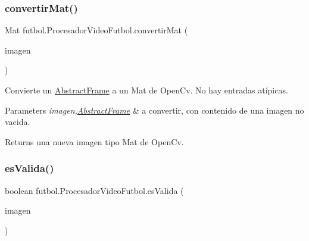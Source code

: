 \hypertarget{classfutbol_1_1_procesador_video_futbol_af31900f6a534dce36238c594d897787a}{}\label{classfutbol_1_1_procesador_video_futbol_af31900f6a534dce36238c594d897787a} 
\subsubsection{\texorpdfstring{convertir\+Mat()}{convertirMat()}}
{\footnotesize\ttfamily Mat futbol.\+Procesador\+Video\+Futbol.\+convertir\+Mat (\begin{DoxyParamCaption}\item[{\hyperlink{classfutbol_1_1_abstract_frame}{Abstract\+Frame}}]{imagen }\end{DoxyParamCaption})\hspace{0.3cm}{\ttfamily [private]}}

Convierte un \hyperlink{classfutbol_1_1_abstract_frame}{Abstract\+Frame} a un Mat de Open\+Cv. No hay entradas atípicas. 
\begin{DoxyParams}{Parameters}
{\em imagen,\hyperlink{classfutbol_1_1_abstract_frame}{Abstract\+Frame}} & a convertir, con contenido de una imagen no vacida. \\
\hline
\end{DoxyParams}
\begin{DoxyReturn}{Returns}
una nueva imagen tipo Mat de Open\+Cv. 
\end{DoxyReturn}
\hypertarget{classfutbol_1_1_procesador_video_futbol_ab41c16feae7e86ec6acd5d06ff9af713}{}\label{classfutbol_1_1_procesador_video_futbol_ab41c16feae7e86ec6acd5d06ff9af713} 
\subsubsection{\texorpdfstring{es\+Valida()}{esValida()}}
{\footnotesize\ttfamily boolean futbol.\+Procesador\+Video\+Futbol.\+es\+Valida (\begin{DoxyParamCaption}\item[{\hyperlink{classfutbol_1_1_abstract_frame}{Abstract\+Frame}}]{imagen }\end{DoxyParamCaption})\hspace{0.3cm}{\ttfamily [private]}}

